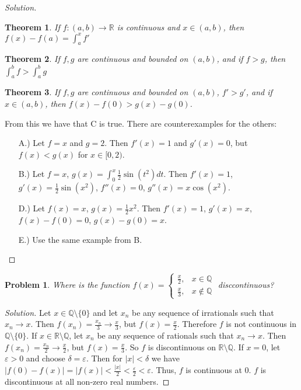 \documentclass[crop=false,class=book]{standalone}
\theoremstyle{mystyle}
\newtheorem{problem}{Problem}[section]
\newtheorem*{theorem*}{Theorem}
\begin{document}
\begin{proof}[Solution]
\begin{theorem*}
If $f:(a,b)\rightarrow \mathbb{R}$ is continuous and $x\in (a,b)$, then $f(x)-f(a) = \int_{a}^{x}f'$ 
\end{theorem*}
\begin{theorem*}
If $f,g$ are continuous and bounded on $(a,b)$, and if $f>g$, then $\int_{a}^{b}f > \int_{a}^{b}g$
\end{theorem*}
\begin{theorem*}
If $f,g$ are continuous and bounded on $(a,b)$, $f'>g'$, and if $x\in (a,b)$, then $f(x) - f(0) > g(x) - g(0)$.
\end{theorem*}
From this we have that C is true. There are counterexamples for the others:
\begin{enumerate}
    \item[A.)] Let $f = x$ and $g = 2$. Then $f'(x) = 1$ and $g'(x) = 0$, but $f(x)<g(x)$ for $x\in [0,2)$.
    \item[B.)] Let $f = x$, $g(x) = \int_{0}^{x} \frac{1}{2}\sin(t^2)dt$. Then $f'(x) = 1$, $g'(x) = \frac{1}{2}\sin(x^2)$, $f''(x) = 0$, $g''(x) = x\cos(x^2)$.
    \item[D.)] Let $f(x) = x$, $g(x) = \frac{1}{2}x^2$. Then $f'(x) = 1$, $g'(x) = x$, $f(x)-f(0) = 0$, $g(x)-g(0) = x$.
    \item[E.)] Use the same example from B.
\end{enumerate}
\end{proof}
\begin{problem}
Where is the function $f(x) = \begin{cases} \frac{x}{2}, & x\in \mathbb{Q} \\ \frac{x}{3}, & x \notin \mathbb{Q}\end{cases}$ disccontinuous?
\end{problem}
\begin{proof}[Solution]
Let $x\in \mathbb{Q}\setminus \{0\}$ and let $x_n$ be any sequence of irrationals such that $x_n \rightarrow x$. Then $f(x_n) = \frac{x_n}{3} \rightarrow \frac{x}{3}$, but $f(x) = \frac{x}{2}$. Therefore $f$ is not continuous in $\mathbb{Q}\setminus \{0\}$. If $x\in \mathbb{R}\setminus \mathbb{Q}$, let $x_n$ be any sequence of rationals such that $x_n \rightarrow x$. Then $f(x_n) = \frac{x_n}{2} \rightarrow \frac{x}{2}$, but $f(x) = \frac{x}{3}$. So $f$ is discontinuous on $\mathbb{R}\setminus \mathbb{Q}$. If $x= 0$, let $\varepsilon>0$ and choose $\delta = \varepsilon$. Then for $|x|<\delta$ we have $|f(0) - f(x)| = |f(x)| < \frac{|x|}{2} < \frac{\varepsilon}{2}<\varepsilon$. Thus, $f$ is continuous at $0$. $f$ is discontinuous at all non-zero real numbers.
\end{proof}
\end{document}
